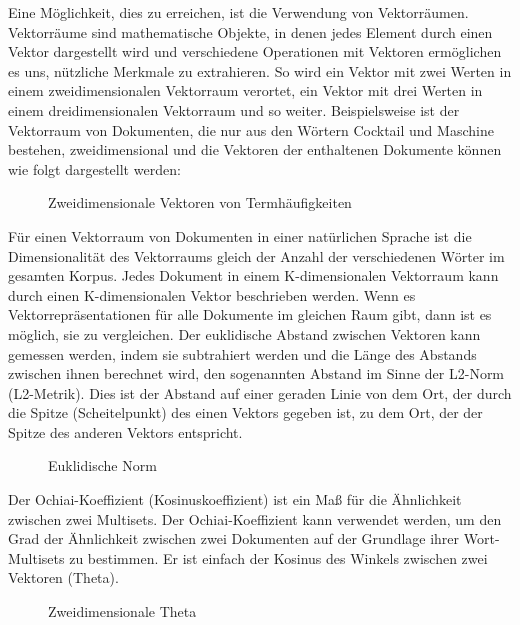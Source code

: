 Eine Möglichkeit, dies zu erreichen, ist die Verwendung von Vektorräumen. 
Vektorräume sind mathematische Objekte, in denen jedes Element durch einen Vektor dargestellt wird und verschiedene Operationen mit Vektoren ermöglichen es uns, nützliche Merkmale zu extrahieren. 
So wird ein Vektor mit zwei Werten in einem zweidimensionalen Vektorraum verortet, ein Vektor mit drei Werten in einem dreidimensionalen Vektorraum und so weiter. 
Beispielsweise ist der Vektorraum von Dokumenten, die nur aus den Wörtern \glqq Cocktail\grqq{} und \glqq Maschine\grqq{} bestehen, zweidimensional und die Vektoren der enthaltenen Dokumente können wie folgt dargestellt werden:
\begin{figure}[H]
    \centering
    \caption{\label{figure:Vraum}Zweidimensionale Vektoren von Termhäufigkeiten}
\end{figure}
\noindent
Für einen Vektorraum von Dokumenten in einer natürlichen Sprache ist die Dimensionalität des Vektorraums gleich der Anzahl der verschiedenen Wörter im gesamten Korpus. 
Jedes Dokument in einem K-dimensionalen Vektorraum kann durch einen K-dimensionalen Vektor beschrieben werden. 
Wenn es Vektorrepräsentationen für alle Dokumente im gleichen Raum gibt, dann ist es möglich, sie zu vergleichen. 
Der euklidische Abstand zwischen Vektoren kann gemessen werden, indem sie subtrahiert werden und die Länge des Abstands zwischen ihnen berechnet wird, den sogenannten Abstand im Sinne der L2-Norm (L2-Metrik). 
Dies ist der Abstand auf einer geraden Linie von dem Ort, der durch die Spitze (Scheitelpunkt) des einen Vektors gegeben ist, zu dem Ort, der der Spitze des anderen Vektors entspricht.
\begin{figure}[H]
    \centering
    \caption{\label{figure:euklidische_Norm}Euklidische Norm}
\end{figure}
\noindent
Der Ochiai-Koeffizient (Kosinuskoeffizient) ist ein Maß für die Ähnlichkeit zwischen zwei Multisets. 
Der Ochiai-Koeffizient kann verwendet werden, um den Grad der Ähnlichkeit zwischen zwei Dokumenten auf der Grundlage ihrer Wort-Multisets zu bestimmen. 
Er ist einfach der Kosinus des Winkels zwischen zwei Vektoren (Theta).
\begin{figure}[H]
    \centering
    \caption{\label{figure:Vraum_Theta}Zweidimensionale Theta}
\end{figure}
\noindent
